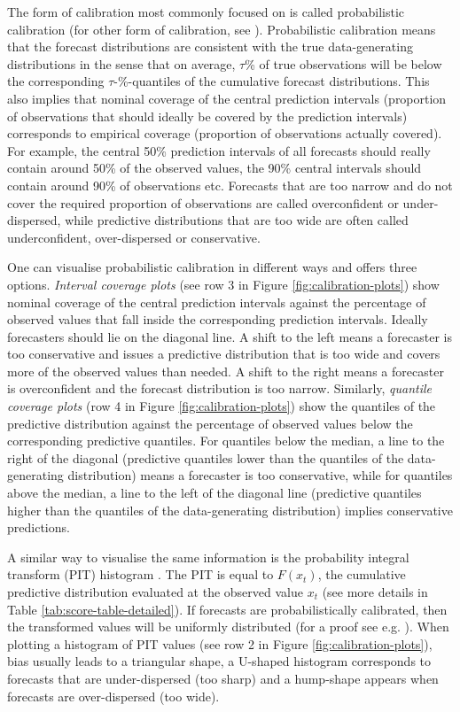 \documentclass[
]{jss}
\begin{document}
The form of calibration most commonly focused on is called probabilistic
calibration (for other form of calibration, see
\cite{gneitingProbabilisticForecastsCalibration2007}). Probabilistic
calibration means that the forecast distributions are consistent with
the true data-generating distributions in the sense that on average,
\(\tau\)\% of true observations will be below the corresponding
\(\tau\)-\%-quantiles of the cumulative forecast distributions. This
also implies that nominal coverage of the central prediction intervals
(proportion of observations that should ideally be covered by the
prediction intervals) corresponds to empirical coverage (proportion of
observations actually covered). For example, the central 50\% prediction
intervals of all forecasts should really contain around 50\% of the
observed values, the 90\% central intervals should contain around 90\%
of observations etc. Forecasts that are too narrow and do not cover the
required proportion of observations are called overconfident or
under-dispersed, while predictive distributions that are too wide are
often called underconfident, over-dispersed or conservative.

One can visualise probabilistic calibration in different ways and
 offers three options. \emph{Interval coverage plots}
(see row 3 in Figure \ref{fig:calibration-plots}) show nominal coverage
of the central prediction intervals against the percentage of observed
values that fall inside the corresponding prediction intervals. Ideally
forecasters should lie on the diagonal line. A shift to the left means a
forecaster is too conservative and issues a predictive distribution that
is too wide and covers more of the observed values than needed. A shift
to the right means a forecaster is overconfident and the forecast
distribution is too narrow. Similarly, \emph{quantile coverage plots}
(row 4 in Figure \ref{fig:calibration-plots}) show the quantiles of the
predictive distribution against the percentage of observed values below
the corresponding predictive quantiles. For quantiles below the median,
a line to the right of the diagonal (predictive quantiles lower than the
quantiles of the data-generating distribution) means a forecaster is too
conservative, while for quantiles above the median, a line to the left
of the diagonal line (predictive quantiles higher than the quantiles of
the data-generating distribution) implies conservative predictions.

A similar way to visualise the same information is the probability
integral transform (PIT) histogram
\citep{dawidPresentPositionPotential1984}. The PIT is equal to
\(F(x_t)\), the cumulative predictive distribution evaluated at the
observed value \(x_t\) (see more details in Table
\ref{tab:score-table-detailed}). If forecasts are probabilistically
calibrated, then the transformed values will be uniformly distributed
(for a proof see e.g. \citet{angusProbabilityIntegralTransform1994}).
When plotting a histogram of PIT values (see row 2 in Figure
\ref{fig:calibration-plots}), bias usually leads to a triangular shape,
a U-shaped histogram corresponds to forecasts that are under-dispersed
(too sharp) and a hump-shape appears when forecasts are over-dispersed
(too wide).
\end{document}
